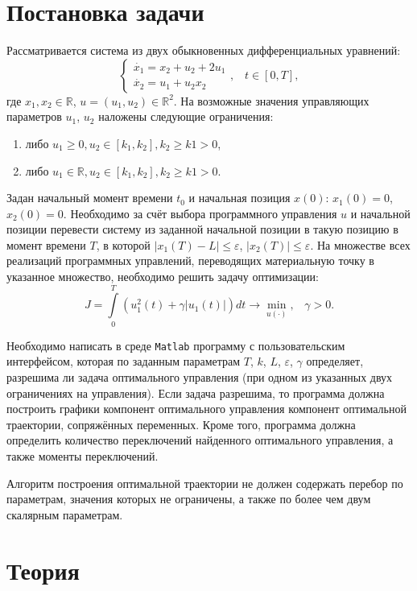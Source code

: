 \documentclass[11pt]{article}
\newcommand\abs[1]{\left\lvert#1\right\rvert}
\begin{document}
\section{Постановка задачи}
Рассматривается система из двух обыкновенных дифференциальных уравнений:
$$
\left\{
\begin{aligned}
\dot{x_1} = x_2 + u_2 + 2u_1 \\
\dot{x_2} = u_1 + u_2 x_2
\end{aligned} \right., \; \; \; t \in [0, T],
$$
где $x_1, x_2 \in \mathbb{R}$, $u = \left( u_1, u_2 \right) \in \mathbb{R}^2$. На возможные значения управляющих параметров $u_1$, $u_2$ наложены следующие ограничения:
\begin{enumerate}
\item
либо $u_1 \geqslant 0, u_2 \in [k_1, k_2], k_2 \geqslant k1 > 0$,
\item
либо $u_1 \in \mathbb{R}, u_2 \in [k_1, k_2], k_2 \geqslant k1 > 0$.
\end{enumerate}
Задан начальный момент времени $t_0$ и начальная позиция $x(0)$: $x_1(0) = 0$, $x_2(0) = 0$. Необходимо за счёт выбора программного управления $u$ и начальной позиции перевести систему из заданной начальной позиции в такую позицию в момент времени $T$, в которой $\abs{x_1(T) - L} \leqslant \varepsilon$, $\abs{x_2(T)} \leqslant \varepsilon$. На множестве всех реализаций программных управлений, переводящих материальную точку в указанное множество, необходимо решить задачу оптимизации:
$$
J = \int \limits_0^T \left( u_1^2(t) + \gamma \abs{u_1(t)} \right) dt \to \min \limits_{u(\cdot)}, \; \; \; \gamma > 0.
$$

Необходимо написать в среде \texttt{Matlab} программу с пользовательским интерфейсом, которая по заданным параметрам $T$, $k$, $L$, $\varepsilon$, $\gamma$ определяет, разрешима ли задача оптимального управления (при одном из указанных двух ограничениях на управления). Если задача разрешима, то программа должна построить графики компонент оптимального управления компонент оптимальной траектории, сопряжённых переменных. Кроме того, программа должна определить количество переключений найденного оптимального управления, а также моменты переключений.

Алгоритм построения оптимальной траектории не должен содержать перебор по параметрам, значения которых не ограничены, а также по более чем двум скалярным параметрам.
\section{Теория}
\end{document}
